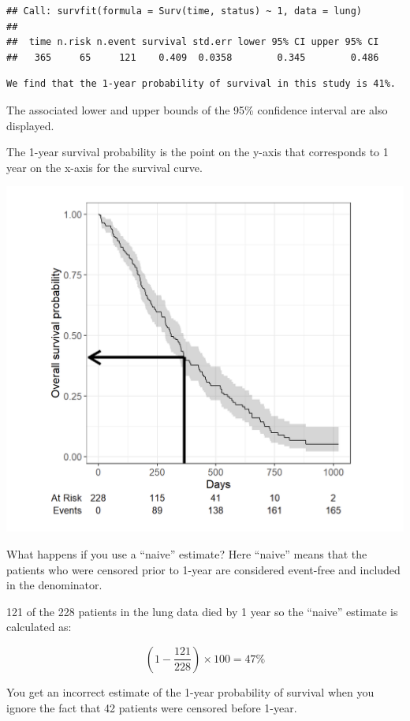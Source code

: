 \documentclass[
]{book}
\begin{document}
\begin{verbatim}
## Call: survfit(formula = Surv(time, status) ~ 1, data = lung)
## 
##  time n.risk n.event survival std.err lower 95% CI upper 95% CI
##   365     65     121    0.409  0.0358        0.345        0.486
\end{verbatim}

\begin{verbatim}
We find that the 1-year probability of survival in this study is 41%.
\end{verbatim}

The associated lower and upper bounds of the 95\% confidence interval are also displayed.

The 1-year survival probability is the point on the y-axis that corresponds to 1
year on the x-axis for the survival curve.

\includegraphics{figs/survival3.png}

What happens if you use a ``naive'' estimate? Here ``naive'' means that the patients who were censored prior to 1-year are considered event-free and included in the denominator.

121 of the 228 patients in the lung data died by 1 year so the ``naive'' estimate is calculated as:

\[(1−\frac{121}{228})×100=47\%\]

You get an incorrect estimate of the 1-year probability of survival when you ignore the fact that 42 patients were censored before 1-year.
\end{document}
